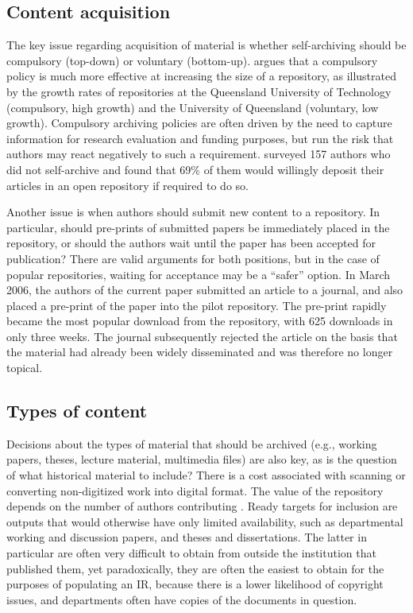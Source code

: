 \documentclass[12pt,pdftex,a4paper,titlepage]{article}
\begin{document}
\subsection{Content acquisition}
\label{sec-content}

The key issue regarding acquisition of material is whether self-archiving should be compulsory (top-down) or voluntary (bottom-up).  argues that a compulsory policy is much more effective at increasing the size of a repository, as illustrated by the growth rates of repositories at the Queensland University of Technology (compulsory, high growth) and the University of Queensland (voluntary, low growth). Compulsory archiving policies are often driven by the need to capture information for research evaluation and funding purposes, but run the risk that authors may react negatively to such a requirement.  surveyed 157 authors who did not self-archive and found that 69\% of them would willingly deposit their articles in an open repository if required to do so.

Another issue is when authors should submit new content to a repository. In particular, should pre-prints of submitted papers be immediately placed in the repository, or should the authors wait until the paper has been accepted for publication? There are valid arguments for both positions, but in the case of popular repositories, waiting for acceptance may be a ``safer'' option. In March 2006, the authors of the current paper submitted an article to a journal, and also placed a pre-print of the paper into the pilot repository. The pre-print rapidly became the most popular download from the repository, with 625 downloads in only three weeks. The journal subsequently rejected the article on the basis that the material had already been widely disseminated and was therefore no longer topical.


\subsection{Types of content}

Decisions about the types of material that should be archived (e.g., working papers, theses, lecture material, multimedia files) are also key, as is the question of what historical material to include? There is a cost associated with scanning or converting non-digitized work into digital format. The value of the repository depends on the number of authors contributing \cite{Rank-J-2005-feasibility}. Ready targets for inclusion are outputs that would otherwise have only limited availability, such as departmental working and discussion papers, and theses and dissertations. The latter in particular are often very difficult to obtain from outside the institution that published them, yet paradoxically, they are often the easiest to obtain for the purposes of populating an IR, because there is a lower likelihood of copyright issues, and departments often have copies of the documents in question.
\end{document}
